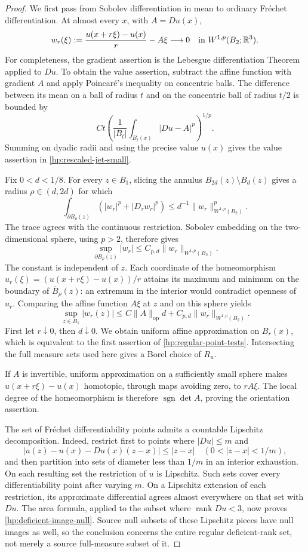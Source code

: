 \documentclass[11pt]{article}
\numberwithin{equation}{section}
\theoremstyle{definition}
\theoremstyle{remark}
\newcommand{\R}{\mathbb R}
\newcommand{\op}{\mathrm{op}}
\DeclareMathOperator{\rank}{rank}
\begin{document}
\begin{proof}
We first pass from Sobolev differentiation in mean to ordinary
Fr\'echet differentiation.  At almost every $x$, with $A=Du(x)$,
\begin{equation}\label{hp:rescaled-jet-small}
 w_r(\xi):=\frac{u(x+r\xi)-u(x)}{r}-A\xi
 \longrightarrow0 \quad\hbox{in }W^{1,p}(B_2;\R^3).
\end{equation}
For completeness, the gradient assertion is the Lebesgue differentiation
Theorem applied to $Du$.  To obtain the value assertion, subtract the
affine function with gradient $A$ and apply Poincar\'e's inequality on
concentric balls.  The difference between its mean on a ball of radius
$t$ and on the concentric ball of radius $t/2$ is bounded by
\[
 Ct\left(\frac{1}{|B_t|}\int_{B_t(x)}|Du-A|^p\right)^{1/p}.
\]
Summing on dyadic radii and using the precise value $u(x)$ gives the
value assertion in \eqref{hp:rescaled-jet-small}.

Fix $0<d<1/8$.  For every $z\in B_1$, slicing the annulus
$B_{2d}(z)\setminus B_d(z)$ gives a radius $\rho\in(d,2d)$ for which
\[
 \int_{\partial B_\rho(z)}
   (|w_r|^p+|D_\tau w_r|^p)
 \le d^{-1}\|w_r\|_{W^{1,p}(B_2)}^p.
\]
The trace agrees with the continuous restriction.  Sobolev embedding
on the two-dimensional sphere, using $p>2$, therefore gives
\[
 \sup_{\partial B_\rho(z)}|w_r|
 \le C_{p,d}\|w_r\|_{W^{1,p}(B_2)}.
\]
The constant is independent of $z$.  Each coordinate of the
homeomorphism
$u_r(\xi)=(u(x+r\xi)-u(x))/r$ attains its maximum and minimum on
the boundary of $\overline B_\rho(z)$: an extremum in the interior
would contradict openness of $u_r$.  Comparing the affine function
$A\xi$ at $z$ and on this sphere yields
\[
 \sup_{z\in B_1}|w_r(z)|
 \le C\|A\|_{\op}d+C_{p,d}\|w_r\|_{W^{1,p}(B_2)}.
\]
First let $r\downarrow0$, then $d\downarrow0$.  We obtain uniform
affine approximation on $B_r(x)$, which is equivalent to the first
assertion of \eqref{hp:regular-point-tests}.  Intersecting the full
measure sets used here gives a Borel choice of $R_u$.

If $A$ is invertible, uniform approximation on a sufficiently small
sphere makes $u(x+r\xi)-u(x)$ homotopic, through maps avoiding zero,
to $rA\xi$.  The local degree of the homeomorphism is therefore
$\operatorname{sgn}\det A$, proving the orientation assertion.

The set of Fr\'echet differentiability points admits a countable
Lipschitz decomposition.  Indeed, restrict first to points where
$|Du|\le m$ and
\[
 |u(z)-u(x)-Du(x)(z-x)|\le |z-x|
 \quad(0<|z-x|<1/m),
\]
and then partition into sets of diameter less than $1/m$ in an
interior exhaustion.  On each resulting set the restriction of $u$
is Lipschitz.  Such sets cover every differentiability point after
varying $m$.  On a Lipschitz extension of each restriction, its
approximate differential agrees almost everywhere on that set with
$Du$.  The area formula, applied to the subset where $\rank Du<3$,
now proves \eqref{hp:deficient-image-null}.  Source null subsets of
these Lipschitz pieces have null images as well, so the conclusion
concerns the entire regular deficient-rank set, not merely a source
full-measure subset of it.


\end{proof}
\end{document}
